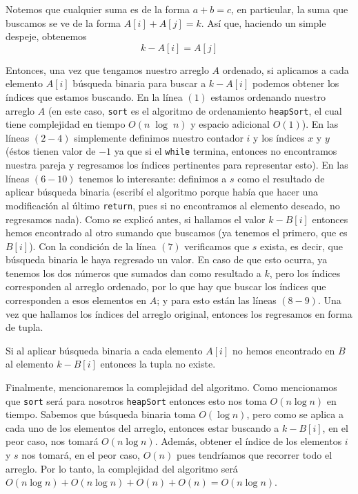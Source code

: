 \documentclass[letterpaper,11pt]{article}
\begin{document}
\begin{enumerate}
    Notemos que cualquier suma es de la forma $a + b = c$, en particular, la 
    suma que buscamos se ve de la forma $A[i] + A[j] = k$. Así que, haciendo 
    un simple despeje, obtenemos
    \begin{equation*}
        k - A[i] = A[j]
    \end{equation*}

    Entonces, una vez que tengamos nuestro arreglo $A$ ordenado, si aplicamos 
    a cada elemento $A[i]$ búsqueda binaria para buscar a $k - A[i]$ podemos 
    obtener los índices que estamos buscando. En la línea $(1)$ estamos 
    ordenando nuestro arreglo $A$ (en este caso, \texttt{sort} es el 
    algoritmo de ordenamiento \texttt{heapSort}, el cual tiene complejidad 
    en tiempo $O(n \; \log \; n)$ y espacio adicional $O(1)$). En las 
    líneas $(2 - 4)$ simplemente definimos nuestro contador $i$ y los índices 
    $x$ y $y$ (éstos tienen valor de $-1$ ya que si el \texttt{while} 
    termina, entonces no encontramos nuestra pareja y regresamos los 
    índices pertinentes para representar esto). En las líneas $(6 - 10)$
    tenemos lo interesante: definimos a $s$ como el resultado de aplicar 
    búsqueda binaria (escribí el algoritmo porque había que hacer una 
    modificación al último \texttt{return}, pues si no encontramos al 
    elemento deseado, no regresamos nada). Como se explicó antes, si 
    hallamos el valor $k - B[i]$ entonces hemos encontrado al otro sumando 
    que buscamos (ya tenemos el primero, que es $B[i]$). Con la condición 
    de la línea $(7)$ verificamos que $s$ exista, es decir, que búsqueda 
    binaria le haya regresado un valor. En caso de que esto ocurra, ya 
    tenemos los dos números que sumados dan como resultado a $k$, pero los 
    índices corresponden al arreglo ordenado, por lo que hay que buscar 
    los índices que corresponden a esos elementos en $A$; y para esto 
    están las líneas $(8 - 9)$. Una vez que hallamos los índices del 
    arreglo original, entonces los regresamos en forma de tupla.

    Si al aplicar búsqueda binaria a cada elemento $A[i]$ no hemos encontrado 
    en $B$ al elemento $k - B[i]$ entonces la tupla no existe. 

    Finalmente, mencionaremos la complejidad del algoritmo. Como mencionamos 
    que \texttt{sort} será para nosotros \texttt{heapSort} entonces esto nos
    toma $O(n \log n)$ en tiempo. Sabemos que búsqueda binaria toma 
    $O(\log n)$, pero como se aplica a cada uno de los elementos del arreglo, 
    entonces estar buscando a $k - B[i]$, en el peor caso, nos tomará 
    $O(n \log n)$. Además, obtener el índice de los elementos $i$ y $s$ nos 
    tomará, en el peor caso, $O(n)$ pues tendríamos que recorrer todo el 
    arreglo. Por lo tanto, la complejidad del algoritmo será 
    $O(n \log n) + O(n \log n) + O(n) + O(n) = O(n \log n)$. 
        

\end{enumerate}
\end{document}

